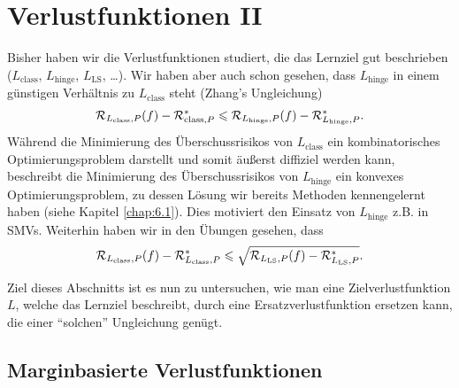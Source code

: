 \chapter{Verlustfunktionen II}

Bisher haben wir die Verlustfunktionen studiert, die das Lernziel gut
beschrieben ($L_\mathrm{class}$, $L_\mathrm{hinge}$, $L_\mathrm{LS}$, \ldots).
Wir haben aber auch schon gesehen, dass $L_\mathrm{hinge}$ in einem günstigen
Verhältnis zu $L_\mathrm{class}$ steht (Zhang's Ungleichung)
\begin{align*}
\mathcal{R}_{L_\mathrm{class},P}(f)-\mathcal{R}_{\mathrm{class},P}^* 
\leqslant \mathcal{R}_{L_\mathrm{hinge},P}(f)-\mathcal{R}_{L_\mathrm{hinge},P}^*.
\end{align*}
Während die Minimierung des Überschussrisikos von $L_\mathrm{class}$ ein
kombinatorisches Optimierungsproblem darstellt und somit äußerst diffiziel
werden kann, beschreibt die Minimierung des Überschussrisikos von
$L_\mathrm{hinge}$ ein konvexes Optimierungsproblem, zu dessen Lösung wir
bereits Methoden kennengelernt haben (siehe Kapitel \ref{chap:6.1}). Dies
motiviert den Einsatz von $L_\mathrm{hinge}$ z.B. in SMVs. Weiterhin haben wir
in den Übungen gesehen, dass
\begin{align*}
\mathcal{R}_{L_\mathrm{class},P}(f)-\mathcal{R}_{L_\mathrm{class},P}^* \leqslant
\sqrt{\mathcal{R}_{L_\mathrm{LS},P}(f)-\mathcal{R}_{L_\mathrm{LS},P}^*}.
\end{align*}

Ziel dieses Abschnitts ist es nun zu untersuchen, wie man eine
Zielverlustfunktion $L$, welche das Lernziel beschreibt, durch eine
Ersatzverlustfunktion ersetzen kann, die einer "`solchen"' Ungleichung genügt. 

\section{Marginbasierte Verlustfunktionen}

